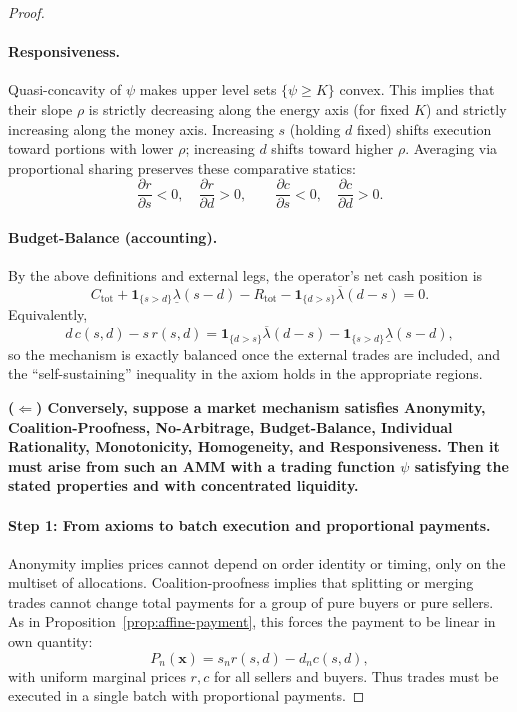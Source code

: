 \documentclass[12pt, notitlepage]{article}
\begin{document}
\begin{proof}
\paragraph{Responsiveness.}
Quasi-concavity of \(\psi\) makes upper level sets \(\{\psi\geq K\}\) convex. This implies that their slope \(\rho\) is strictly decreasing along the energy axis (for fixed \(K\)) and strictly increasing along the money axis. Increasing \(s\) (holding \(d\) fixed) shifts execution toward portions with lower \(\rho\); increasing \(d\) shifts toward higher \(\rho\). Averaging via proportional sharing preserves these comparative statics:
\[
\frac{\partial r}{\partial s}<0,\quad \frac{\partial r}{\partial d}>0,\qquad
\frac{\partial c}{\partial s}<0,\quad \frac{\partial c}{\partial d}>0.
\]

\paragraph{Budget-Balance (accounting).}
By the above definitions and external legs, the operator’s net cash position is
\[
C_{\mathrm{tot}}
+\mathbf{1}_{\{s>d\}}\underline{\lambda}(s-d)
-R_{\mathrm{tot}}
-\mathbf{1}_{\{d>s\}}\overline{\lambda}(d-s)
=0.
\]
Equivalently,
\[
d\,c(s,d)-s\,r(s,d)
=
\mathbf{1}_{\{d>s\}}\overline{\lambda}(d-s)
-
\mathbf{1}_{\{s>d\}}\underline{\lambda}(s-d),
\]
so the mechanism is exactly balanced once the external trades are included, and the “self-sustaining” inequality in the axiom holds in the appropriate regions.

\bigskip
\noindent\textbf{(\(\Leftarrow\)) Conversely, suppose a market mechanism satisfies Anonymity, Coalition-Proofness, No-Arbitrage, Budget-Balance, Individual Rationality, Monotonicity, Homogeneity, and Responsiveness. Then it must arise from such an AMM with a trading function \(\psi\) satisfying the stated properties and with concentrated liquidity.}

\paragraph{Step 1: From axioms to batch execution and proportional payments.}
Anonymity implies prices cannot depend on order identity or timing, only on the multiset of allocations.
Coalition-proofness implies that splitting or merging trades cannot change total payments for a group of pure buyers or pure sellers. As in Proposition~\ref{prop:affine-payment}, this forces the payment to be linear in own quantity:
\[
P_n(\bm{x}) = s_n r(s,d) - d_n c(s,d),
\]
with uniform marginal prices \(r,c\) for all sellers and buyers. Thus trades must be executed in a single batch with proportional payments.


\end{proof}
\end{document}
